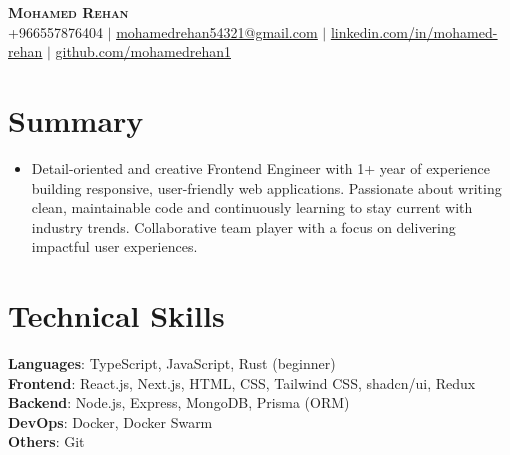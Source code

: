\documentclass[letterpaper,11pt]{article}
\newcommand{\resumeSubHeadingListStart}{\begin{itemize}[leftmargin=0.15in, label={}]}
\newcommand{\resumeSubHeadingListEnd}{\end{itemize}}
\begin{document}

\begin{center}
    \textbf{\Huge \scshape Mohamed Rehan} \\ \vspace{2pt}
    \small  +966557876404 $|$ \href{mailto:x@x.com}{\underline{mohamedrehan54321@gmail.com}} $|$ 
    \href{https://linkedin.com/in/...}{\underline{linkedin.com/in/mohamed-rehan}} $|$
    \href{https://github.com/...}{\underline{github.com/mohamedrehan1}}
\end{center}


\section{Summary}
\resumeSubHeadingListStart
  \item
    \small{Detail-oriented and creative Frontend Engineer with 1+ year of experience building responsive, user-friendly web applications. Passionate about writing clean, maintainable code and continuously learning to stay current with industry trends. Collaborative team player with a focus on delivering impactful user experiences.}
\resumeSubHeadingListEnd



\section{Technical Skills}
 \begin{itemize}[leftmargin=0.15in, label={}]
    \small{\item{
     \textbf{Languages}{:  TypeScript, JavaScript, Rust (beginner)} \\
     \textbf{Frontend}{: React.js, Next.js, HTML, CSS, Tailwind CSS, shadcn/ui, Redux} \\
    \textbf{Backend}{: Node.js, Express, MongoDB, Prisma (ORM)} \\
     \textbf{DevOps}{: Docker, Docker Swarm} \\
     \textbf{Others}{: Git}
    }}
 \end{itemize}
\end{document}
